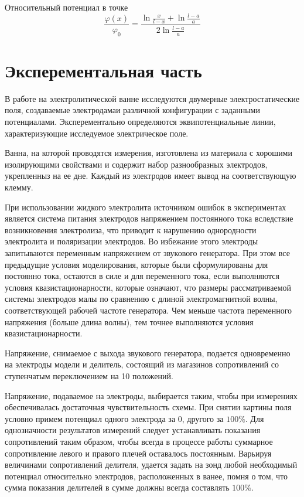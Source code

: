 Относительный потенциал в точке
\begin{equation*}
  \frac{\varphi(x)}{\varphi_0} = \frac{\ln{\frac{x}{l - x}} + \ln{\frac{l - a}{a}}}{2\ln{\frac{l - a}{a}}}  
\end{equation*}


\section*{Эксперементальная часть}

В работе на электролитической ванне исследуются двумерные электростатические поля, создаваемые электродамаи различной конфигурации с заданными потенциалами. Эксперементально определяются эквипотенциальные линии, характеризующие исследуемое электрическое поле.

Ванна, на которой проводятся измерения, изготовлена из материала с хорошими изолирующими свойствами и содержит набор разнообразных электродов, укрепленныз на ее дне. Каждый из электродов имеет вывод на соответствующую клемму. 

При использовании жидкого электролита источником ошибок в экспериментах является система питания электродов напряжением постоянного тока вследствие возникновения электролиза, что приводит к нарушению однородности электролита и поляризации электродов. Во избежание этого электроды запитываются переменным напряжением от звукового генератора. При этом все предыдущие условия моделирования, которые были сформулированы для постоянно тока, остаются в силе и для переменного тока, если выполняются условия квазистационарности, которые означают, что размеры рассматриваемой системы электродов малы по сравнению с длиной электромагнитной волны, соответствующей рабочей частоте генератора. Чем меньше частота переменного напряжения (больше длина волны), тем точнее выполняются условия квазистационарности.

Напряжение, снимаемое с выхода звукового генератора, подается одновременно на электроды модели и делитель, состоящий из магазинов сопротивлений со ступенчатым переключением на 10 положений.

Напряжение, подаваемое на электроды, выбирается таким, чтобы при измерениях обеспечивалась достаточная чувствительность схемы. При снятии картины поля условно примем потенциал одного электрода за $0$, другого за $100\%$. Для однозначности результатов измерений следует устанавливать показания сопротивлений таким образом, чтобы всегда в процессе работы суммарное сопротивление левого и правого плечей оставалось постоянным. Варьируя величинами сопротивлений делителя, удается задать на зонд любой необходимый потенциал относительно электродов, расположенных в ванее, помня о том, что сумма показания делителей в сумме должны всегда составлять $100\%$.

